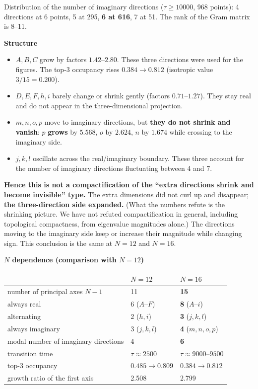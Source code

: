 \documentclass[
  10pt,
]{article}
\newcounter{none} %
\providecommand{\tightlist}{%
  \setlength{\itemsep}{0pt}\setlength{\parskip}{0pt}}
\begin{document}
Distribution of the number of imaginary directions (\(\tau\ge10000\),
968 points): 4 directions at 6 points, 5 at 295, \textbf{6 at 616}, 7 at
51. The rank of the Gram matrix is 8--11.

\textbf{Structure}

\begin{itemize}
\tightlist
\item
  \(A,B,C\) grow by factors \(1.42\)--\(2.80\). These three directions
  were used for the figures. The top-3 occupancy rises \(0.384\to0.812\)
  (isotropic value \(3/15 = 0.200\)).
\item
  \(D,E,F,h,i\) barely change or shrink gently (factors
  \(0.71\)--\(1.27\)). They stay real and do not appear in the
  three-dimensional projection.
\item
  \(m,n,o,p\) move to imaginary directions, but \textbf{they do not
  shrink and vanish}: \(p\) \textbf{grows} by \(5.568\), \(o\) by
  \(2.624\), \(n\) by \(1.674\) while crossing to the imaginary side.
\item
  \(j,k,l\) oscillate across the real/imaginary boundary. These three
  account for the number of imaginary directions fluctuating between 4
  and 7.
\end{itemize}

\textbf{Hence this is not a compactification of the ``extra directions
shrink and become invisible'' type.} The extra dimensions did not curl
up and disappear; \textbf{the three-direction side expanded.} (What the
numbers refute is the shrinking picture. We have not refuted
compactification in general, including topological compactness, from
eigenvalue magnitudes alone.) The directions moving to the imaginary
side keep or increase their magnitude while changing sign. This
conclusion is the same at \(N=12\) and \(N=16\).

\textbf{\(N\) dependence (comparison with \(N=12\))}

{\def\LTcaptype{none} %
\begin{longtable}[]{@{}lll@{}}
\toprule\noalign{}
& \(N=12\) & \(N=16\) \\
\midrule\noalign{}
\endhead
\bottomrule\noalign{}
\endlastfoot
number of principal axes \(N-1\) & 11 & \textbf{15} \\
always real & 6 (\(A\)--\(F\)) & \textbf{8} (\(A\)--\(i\)) \\
alternating & 2 (\(h,i\)) & \textbf{3} (\(j,k,l\)) \\
always imaginary & 3 (\(j,k,l\)) & \textbf{4} (\(m,n,o,p\)) \\
modal number of imaginary directions & 4 & \textbf{6} \\
transition time & \(\tau\approx2500\) & \(\tau\approx9000\)--\(9500\) \\
top-3 occupancy & \(0.485\to0.809\) & \(0.384\to0.812\) \\
growth ratio of the first axis & 2.508 & 2.799 \\
\end{longtable}
}
\end{document}
